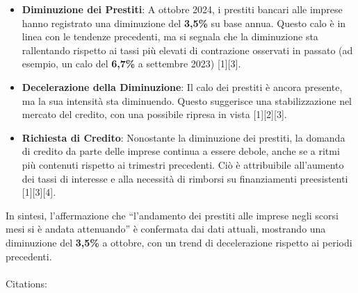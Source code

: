 \documentclass[
  letterpaper,
  DIV=11,
  numbers=noendperiod]{scrartcl}
\makeatletter
\let\oldparagraph\paragraph
\renewcommand{\paragraph}{
    \@ifstar
      \xxxParagraphStar
      \xxxParagraphNoStar
  }
\newcommand{\xxxParagraphStar}[1]{\oldparagraph*{#1}\mbox{}}
\newcommand{\xxxParagraphNoStar}[1]{\oldparagraph{#1}\mbox{}}
\makeatother
\begin{document}
\begin{itemize}
\item
  \textbf{Diminuzione dei Prestiti}: A ottobre 2024, i prestiti bancari
  alle imprese hanno registrato una diminuzione del \textbf{3,5\%} su
  base annua. Questo calo è in linea con le tendenze precedenti, ma si
  segnala che la diminuzione sta rallentando rispetto ai tassi più
  elevati di contrazione osservati in passato (ad esempio, un calo del
  \textbf{6,7\%} a settembre 2023) {[}1{]}{[}3{]}.
\item
  \textbf{Decelerazione della Diminuzione}: Il calo dei prestiti è
  ancora presente, ma la sua intensità sta diminuendo. Questo suggerisce
  una stabilizzazione nel mercato del credito, con una possibile ripresa
  in vista {[}1{]}{[}2{]}{[}3{]}.
\item
  \textbf{Richiesta di Credito}: Nonostante la diminuzione dei prestiti,
  la domanda di credito da parte delle imprese continua a essere debole,
  anche se a ritmi più contenuti rispetto ai trimestri precedenti. Ciò è
  attribuibile all'aumento dei tassi di interesse e alla necessità di
  rimborsi su finanziamenti preesistenti {[}1{]}{[}3{]}{[}4{]}.
\end{itemize}

\begin{tcolorbox}[enhanced jigsaw, bottomrule=.15mm, opacityback=0, leftrule=.75mm, breakable, titlerule=0mm, left=2mm, title=\textcolor{quarto-callout-warning-color}{\faExclamationTriangle}\hspace{0.5em}{Conclusione}, colframe=quarto-callout-warning-color-frame, coltitle=black, colback=white, toprule=.15mm, colbacktitle=quarto-callout-warning-color!10!white, bottomtitle=1mm, toptitle=1mm, arc=.35mm, rightrule=.15mm, opacitybacktitle=0.6]

In sintesi, l'affermazione che ``l'andamento dei prestiti alle imprese
negli scorsi mesi si è andata attenuando'' è confermata dai dati
attuali, mostrando una diminuzione del \textbf{3,5\%} a ottobre, con un
trend di decelerazione rispetto ai periodi precedenti.

\end{tcolorbox}

\paragraph{Citations:}\label{citations-2}
\end{document}
